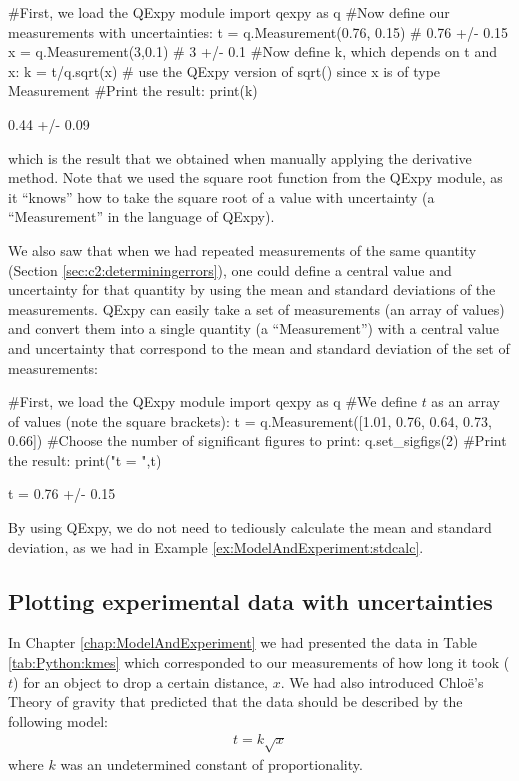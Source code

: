 \begin{python}[caption=QExpy to propagate uncertainties] 
#First, we load the QExpy module
import qexpy as q
#Now define our measurements with uncertainties:
t = q.Measurement(0.76, 0.15) # 0.76 +/- 0.15
x = q.Measurement(3,0.1) # 3 +/- 0.1
#Now define k, which depends on t and x:
k = t/q.sqrt(x) # use the QExpy version of sqrt() since x is of type Measurement
#Print the result:
print(k)
\end{python}
\begin{poutput}
0.44 +/- 0.09
\end{poutput}
which is the result that we obtained when manually applying the derivative method. Note that we used the square root function from the QExpy module, as it ``knows'' how to take the square root of a value with uncertainty (a ``Measurement'' in the language of QExpy). 

We also saw that when we had repeated measurements of the same quantity (Section \ref{sec:c2:determiningerrors}), one could define a central value and uncertainty for that quantity by using the mean and standard deviations of the measurements. QExpy can easily take a set of measurements (an array of values) and convert them into a single quantity (a ``Measurement'') with a central value and uncertainty that correspond to the mean and standard deviation of the set of measurements:

\begin{python}[caption=QExpy to calculate mean and standard deviation] 
#First, we load the QExpy module
import qexpy as q
#We define $t$ as an array of values (note the square brackets):
t = q.Measurement([1.01,  0.76,  0.64,  0.73,  0.66])
#Choose the number of significant figures to print:
q.set_sigfigs(2)
#Print the result:
print("t = ",t)
\end{python}
\begin{poutput}
t = 0.76 +/- 0.15
\end{poutput}
By using QExpy, we do not need to tediously calculate the mean and standard deviation, as we had in Example \ref{ex:ModelAndExperiment:stdcalc}.


\subsection{Plotting experimental data with uncertainties}
In Chapter \ref{chap:ModelAndExperiment} we had presented the data in Table \ref{tab:Python:kmes} which corresponded to our measurements of how long it took ($t$) for an object to drop a certain distance, $x$. We had also introduced  Chlo\"e's Theory of gravity that predicted that the data should be described by the following model:
\begin{align*}
t = k \sqrt{x}
\end{align*}
where $k$ was an undetermined constant of proportionality.

